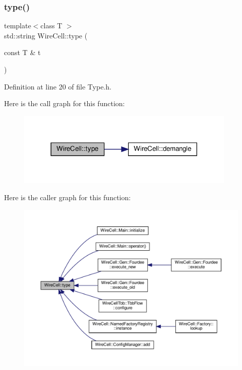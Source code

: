 \subsubsection{\texorpdfstring{type()}{type()}}
{\footnotesize\ttfamily template$<$class T $>$ \\
std\+::string Wire\+Cell\+::type (\begin{DoxyParamCaption}\item[{const T \&}]{t }\end{DoxyParamCaption})}



Definition at line 20 of file Type.\+h.

Here is the call graph for this function\+:
\nopagebreak
\begin{figure}[H]
\begin{center}
\leavevmode
\includegraphics[width=297pt]{namespace_wire_cell_a1f69a2598e2cdb413ffac1157b50670a_cgraph}
\end{center}
\end{figure}
Here is the caller graph for this function\+:
\nopagebreak
\begin{figure}[H]
\begin{center}
\leavevmode
\includegraphics[width=350pt]{namespace_wire_cell_a1f69a2598e2cdb413ffac1157b50670a_icgraph}
\end{center}
\end{figure}
\mbox{\label{namespace_wire_cell_a5d4ad22423a3c77cc4f57d3a7aa95f49}} 

